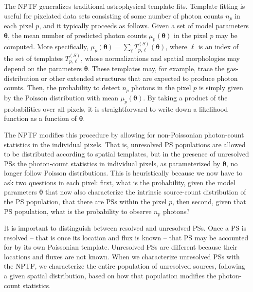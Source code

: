 The NPTF generalizes traditional astrophysical template fits.  Template fitting is useful for pixelated data sets consisting of some number of photon counts $n_p$ in each pixel $p$, and it typically proceeds as follows.   Given a set of model parameters $\bm{\theta}$, the mean number of predicted photon counts $\mu_p({\bm{\theta}})$ in the pixel $p$ may be computed.  More specifically, $\mu_p({\bm{\theta}}) = \sum_{\ell} T^{(S)}_{p,\ell}({\bm{\theta}})$, where $\ell$ is an index of the set of templates $T^{(S)}_{p, \ell}$, whose normalizations and spatial morphologies may depend on the parameters $\bm{\theta}$. These templates may, for example, trace the gas-distribution or other extended structures that are expected to produce photon counts.  Then, the probability to detect $n_p$ photons in the pixel $p$ is simply given by the Poisson distribution with mean $\mu_p({\bm{\theta}})$.  By taking a product of the probabilities over all pixels, it is straightforward to write down a likelihood function as a function of ${\bm{\theta}}$.  

The NPTF modifies this procedure by allowing for non-Poissonian photon-count statistics in the individual pixels.  That is, unresolved PS populations are allowed to be distributed according to spatial templates, but in the presence of unresolved PSs the photon-count statistics in individual pixels, as parameterized by ${\bm{\theta}}$, no longer follow Poisson distributions.  This is heuristically because we now have to ask two questions in each pixel: first, what is the probability, given the model parameters ${\bm{\theta}}$ that now also characterize the intrinsic source-count distribution of the PS population, that there are PSs within the pixel $p$, then second, given that PS population, what is the probability to observe $n_p$ photons?

It is important to distinguish between resolved and unresolved PSs.  Once a PS is resolved -- that is once its location and flux is known -- that PS may be accounted for by its own Poissonian template.  Unresolved PSs are different because their locations and fluxes are not known.  When we characterize unresolved PSs with the NPTF, we characterize the entire population of unresolved sources, following a given spatial distribution, based on how that population modifies the photon-count statistics.
  
